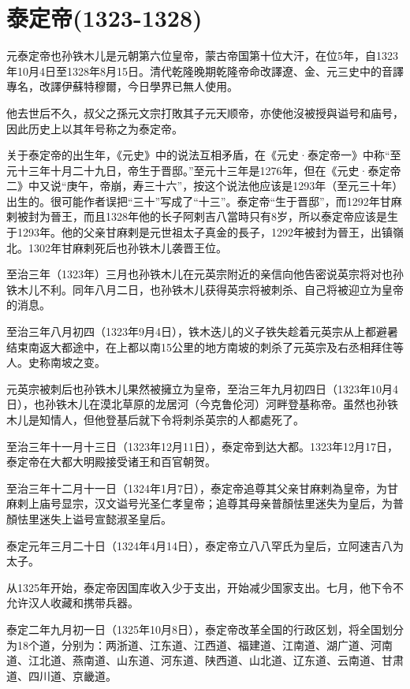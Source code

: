 
\section{泰定帝\tiny(1323-1328)}

元泰定帝也孙铁木儿是元朝第六位皇帝，蒙古帝国第十位大汗，在位5年，自1323年10月4日至1328年8月15日。清代乾隆晚期乾隆帝命改譯遼、金、元三史中的音譯專名，改譯伊蘇特穆爾，今日學界已無人使用。

他去世后不久，叔父之孫元文宗打敗其子元天顺帝，亦使他沒被授與谥号和庙号，因此历史上以其年号称之为泰定帝。

关于泰定帝的出生年，《元史》中的说法互相矛盾，在《元史·泰定帝一》中称“至元十三年十月二十九日，帝生于晋邸。”至元十三年是1276年，但在《元史·泰定帝二》中又说“庚午，帝崩，寿三十六”，按这个说法他应该是1293年（至元三十年）出生的。很可能作者误把“三十”写成了“十三”。泰定帝“生于晋邸”，而1292年甘麻剌被封为晉王，而且1328年他的长子阿剌吉八當時只有8岁，所以泰定帝应该是生于1293年。他的父亲甘麻剌是元世祖太子真金的長子，1292年被封为晉王，出镇嶺北。1302年甘麻剌死后也孙铁木儿袭晋王位。

至治三年（1323年）三月也孙铁木儿在元英宗附近的亲信向他告密说英宗将对也孙铁木儿不利。同年八月二日，也孙铁木儿获得英宗将被刺杀、自己将被迎立为皇帝的消息。

至治三年八月初四（1323年9月4日），铁木迭儿的义子铁失趁着元英宗从上都避暑结束南返大都途中，在上都以南15公里的地方南坡的刺杀了元英宗及右丞相拜住等人。史称南坡之变。

元英宗被刺后也孙铁木儿果然被擁立为皇帝，至治三年九月初四日（1323年10月4日），也孙铁木儿在漠北草原的龙居河（今克鲁伦河）河畔登基称帝。虽然也孙铁木儿是知情人，但他登基后就下令将刺杀英宗的人都處死了。

至治三年十一月十三日（1323年12月11日），泰定帝到达大都。1323年12月17日，泰定帝在大都大明殿接受诸王和百官朝贺。

至治三年十二月十一日（1324年1月7日），泰定帝追尊其父亲甘麻剌為皇帝，为甘麻剌上庙号显宗，汉文谥号光圣仁孝皇帝；追尊其母亲普顏怯里迷失为皇后，为普顏怯里迷失上谥号宣懿淑圣皇后。

泰定元年三月二十日（1324年4月14日），泰定帝立八八罕氏为皇后，立阿速吉八为太子。

从1325年开始，泰定帝因国库收入少于支出，开始减少国家支出。七月，他下令不允许汉人收藏和携带兵器。

泰定二年九月初一日（1325年10月8日），泰定帝改革全国的行政区划，将全国划分为18个道，分别为：两浙道、江东道、江西道、福建道、江南道、湖广道、河南道、江北道、燕南道、山东道、河东道、陕西道、山北道、辽东道、云南道、甘肃道、四川道、京畿道。

